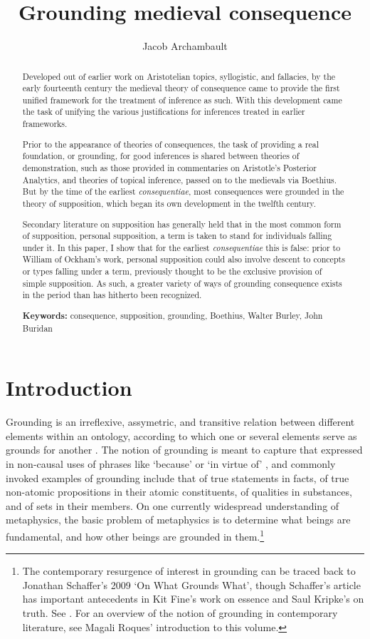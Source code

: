 \documentclass[a4paper, 11pt]{article}
\title{Grounding medieval consequence}
\author{Jacob Archambault}
\begin{document}
\maketitle


\begin{abstract}
Developed out of earlier work on Aristotelian topics, syllogistic, and fallacies, by the early fourteenth century the medieval theory of consequence came to provide the first unified framework for the treatment of inference as such. With this development came the task of unifying the various justifications for inferences treated in earlier frameworks. 

Prior to the appearance of theories of consequences, the task of providing a real foundation, or grounding, for good inferences is shared between theories of demonstration, such as those provided in commentaries on Aristotle’s Posterior Analytics, and theories of topical inference, passed on to the medievals via Boethius. But by the time of the earliest \emph{consequentiae}, most consequences were grounded in the theory of supposition, which began its own development in the twelfth century. 

Secondary literature on supposition has generally held that in the most common form of supposition, personal supposition, a term is taken to stand for individuals falling under it. In this paper, I show that for the earliest \emph{consequentiae} this is false: prior to William of Ockham’s work, personal supposition could also involve descent to concepts or types falling under a term, previously thought to be the exclusive provision of simple supposition. As such, a greater variety of ways of grounding consequence exists in the period than has hitherto been recognized.

\textbf{Keywords:} consequence, supposition, grounding, Boethius, Walter Burley, John Buridan
\end{abstract}
\section{Introduction}
Grounding is an irreflexive, assymetric, and transitive relation between different elements within an ontology, according to which one or several elements serve as grounds for another \autocite[364]{Schaffer2009}. The notion of grounding is meant to capture that expressed in non-causal uses of phrases like `because' or `in virtue of' \autocite[6-7]{Schnieder2019}, and commonly invoked examples of grounding include that of true statements in facts, of true non-atomic propositions in their atomic constituents, of qualities in substances, and of sets in their members. On one currently widespread understanding of metaphysics, the basic problem of metaphysics is to determine what beings are fundamental, and how other beings are grounded in them.\footnote{The contemporary resurgence of interest in grounding can be traced back to Jonathan Schaffer's 2009 `On What Grounds What', though Schaffer's article has important antecedents in Kit Fine's work on essence and Saul Kripke's on truth. See  \autocite{Fine1994,Fine2012,Kripke1975,Schaffer2009,Schaffer2016}. For an overview of the notion of grounding in contemporary literature, see Magali Roques' introduction to this volume.} 
\end{document}
